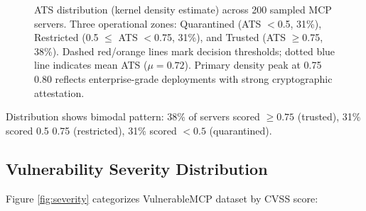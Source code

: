 \documentclass[12pt,twocolumn,journal]{IEEEtran}
\begin{document}
\begin{figure}[!t]
\caption{ATS distribution (kernel density estimate) across 200 sampled MCP servers. Three operational zones: Quarantined (ATS $<$0.5, 31\%), Restricted (0.5 $\leq$ ATS $<$0.75, 31\%), and Trusted (ATS $\geq$0.75, 38\%). Dashed red/orange lines mark decision thresholds; dotted blue line indicates mean ATS ($\mu=0.72$). Primary density peak at 0.75 0.80 reflects enterprise-grade deployments with strong cryptographic attestation.}
\label{fig:ats_dist}
\end{figure}

Distribution shows bimodal pattern: 38\% of servers scored $\geq 0.75$ (trusted), 31\% scored 0.5 0.75 (restricted), 31\% scored $< 0.5$ (quarantined).

\subsection{Vulnerability Severity Distribution}

Figure \ref{fig:severity} categorizes VulnerableMCP dataset by CVSS score:
\end{document}
